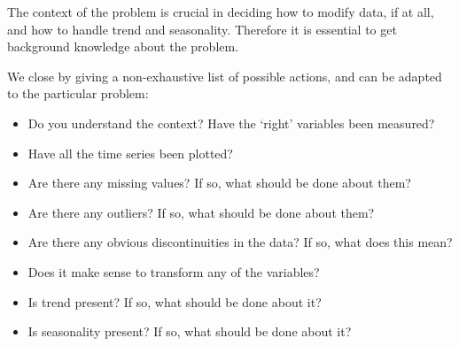 The context of the problem is crucial in deciding how to modify data, if at all, and how to handle trend and seasonality. Therefore it is essential to get background knowledge about the problem.

We close by giving a non-exhaustive list of possible actions, and can be adapted to the particular problem:
\begin{itemize}
	\item Do you understand the context? Have the `right' variables been measured?
	\item Have all the time series been plotted?
	\item Are there any missing values? If so, what should be done about them?
	\item Are there any outliers? If so, what should be done about them?
	\item Are there any obvious discontinuities in the data? If so, what does this mean?
	\item Does it make sense to transform any of the variables?
	\item Is trend present? If so, what should be done about it?
	\item Is seasonality present? If so, what should be done about it?
\end{itemize}

